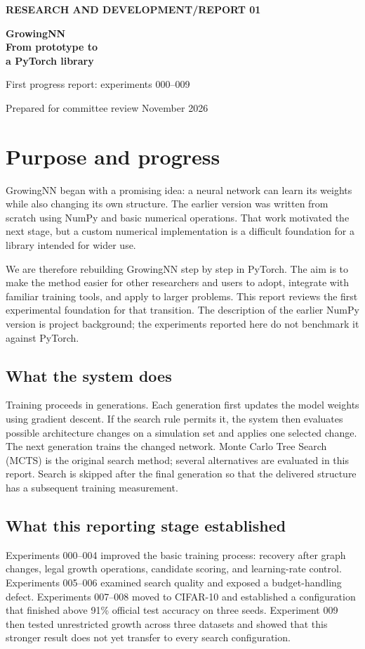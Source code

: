 \documentclass[11pt,a4paper]{article}
\begin{document}
{\small\bfseries\color{teal} RESEARCH AND DEVELOPMENT\quad /\quad REPORT 01}
\vspace{4mm}
{\Huge\bfseries\color{ink} GrowingNN\\[2mm] From prototype to\\[2mm] a PyTorch library\par}
\vspace{3mm}
{\large First progress report: experiments 000--009\par}
{\small Prepared for committee review\quad\textbullet{} November 2026}
\vspace{4mm}

\section{Purpose and progress}
GrowingNN began with a promising idea: a neural network can learn its weights while also changing its own structure. The earlier version was written from scratch using NumPy and basic numerical operations. That work motivated the next stage, but a custom numerical implementation is a difficult foundation for a library intended for wider use.

We are therefore rebuilding GrowingNN step by step in PyTorch. The aim is to make the method easier for other researchers and users to adopt, integrate with familiar training tools, and apply to larger problems. This report reviews the first experimental foundation for that transition. The description of the earlier NumPy version is project background; the experiments reported here do not benchmark it against PyTorch.

\subsection{What the system does}
Training proceeds in generations. Each generation first updates the model weights using gradient descent. If the search rule permits it, the system then evaluates possible architecture changes on a simulation set and applies one selected change. The next generation trains the changed network. Monte Carlo Tree Search (MCTS) is the original search method; several alternatives are evaluated in this report. Search is skipped after the final generation so that the delivered structure has a subsequent training measurement.

\subsection{What this reporting stage established}
Experiments 000--004 improved the basic training process: recovery after graph changes, legal growth operations, candidate scoring, and learning-rate control. Experiments 005--006 examined search quality and exposed a budget-handling defect. Experiments 007--008 moved to CIFAR-10 and established a configuration that finished above 91\% official test accuracy on three seeds. Experiment 009 then tested unrestricted growth across three datasets and showed that this stronger result does not yet transfer to every search configuration.
\end{document}
